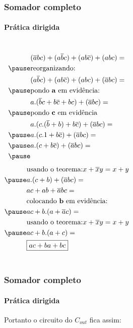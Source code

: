 \begin{frame}
	\frametitle{Somador completo}
	\framesubtitle{\textbf{Prática dirigida}}
	\begin{columns}
			\begin{equation}
				\begin{aligned}
					&(\overline{a}bc)+(a\overline{b}c)+(ab\overline{c})+(abc) = \\ \pause
					&\text{reorganizando:} \\
					&(a\overline{b}c)+(ab\overline{c})+(abc)+(\overline{a}bc) = \\ \pause
					&\text{pondo \textbf{a} em evidência:} \\
					&a.(\overline{b}c+b\overline{c}+bc)+(\overline{a}bc) = \\ \pause
					&\text{pondo \textbf{c} em evidência} \\
					&a.(c.(\overline{b}+b)+b\overline{c})+(\overline{a}bc) = \\ \pause
					&a.(c.1+b\overline{c})+(\overline{a}bc) = \\ \pause
					&a.(c+b\overline{c})+(\overline{a}bc) = \\ \pause
				\end{aligned}
			\end{equation}
			\begin{equation}
				\begin{aligned}
					&\text{usando o teorema:} x+\overline{x}y = x+y \\ \pause
					&a.(c+b)+(\overline{a}bc) = \\
					&ac+ab+\overline{a}bc = \\ 
					&\text{colocando \textbf{b} em evidência:} \\ \pause
					&ac+b.(a+\overline{a}c) = \\
					&\text{usando o teorema:} x+\overline{x}y = x+y \\ \pause
					&ac+b.(a+c) = \\
					&\boxed{ac+ba+bc}
				\end{aligned}
			\end{equation}
	\end{columns}
\end{frame}

\begin{frame}
	\frametitle{Somador completo}
	\framesubtitle{\textbf{Prática dirigida}}
	\par Portanto o circuito do $C_{out}$ fica assim:
	\begin{figure}
		\centering
		
		\label{fig:somadorcompletoparte02}
	\end{figure}
\end{frame}

